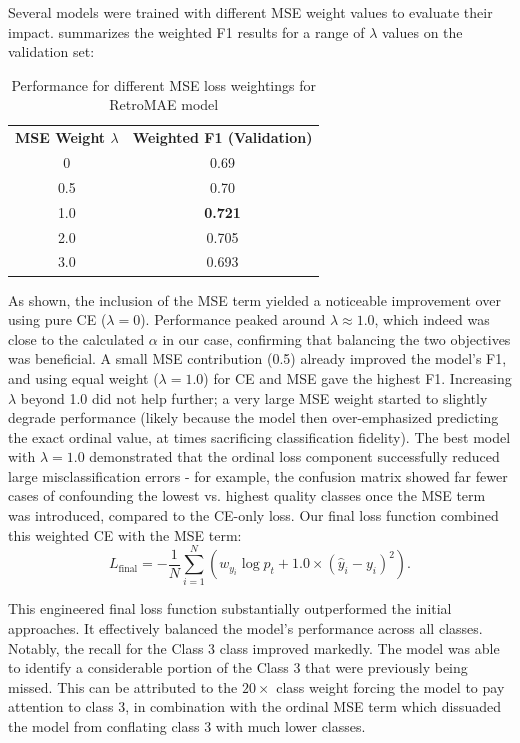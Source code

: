 Several models were trained with different \ac{MSE} weight values to evaluate their impact.  summarizes the weighted F1 results for a range of $\lambda$ values on the validation set:

\begin{table}[H]
\centering
\begin{tabular}{cc}
\textbf{MSE Weight $\lambda$} & \textbf{Weighted F1 (Validation)} \\
0 & 0.69 \\
0.5 & 0.70 \\
1.0 & \textbf{0.721} \\
2.0 & 0.705 \\
3.0 & 0.693 \\
\end{tabular}
\caption{Performance for different \ac{MSE} loss weightings for \ac{RetroMAE} model}
\label{tab:mse_weight_results}
\end{table}
As shown, the inclusion of the \ac{MSE} term yielded a noticeable improvement over using pure \ac{CE} ($\lambda=0$). Performance peaked around $\lambda \approx 1.0$, which indeed was close to the calculated $\alpha$ in our case, confirming that balancing the two objectives was beneficial. A small \ac{MSE} contribution (0.5) already improved the model's F1, and using equal weight ($\lambda=1.0$) for \ac{CE} and \ac{MSE} gave the highest F1. Increasing $\lambda$ beyond 1.0 did not help further; a very large \ac{MSE} weight started to slightly degrade performance (likely because the model then over-emphasized predicting the exact ordinal value, at times sacrificing classification fidelity). The best model with $\lambda=1.0$ demonstrated that the ordinal loss component successfully reduced large misclassification errors - for example, the confusion matrix showed far fewer cases of confounding the lowest vs. highest quality classes once the \ac{MSE} term was introduced, compared to the \ac{CE}-only loss.
Our final loss function combined this weighted \ac{CE} with the \ac{MSE} term:
\begin{equation}
  L_{\text{final}} = - \frac{1}{N} \sum_{i=1}^{N}( w_{y_i}\log p_t + 1.0 \times (\hat{y}_i - y_i)^2).
  \label{eq:final_loss}
\end{equation}

This engineered final loss function substantially outperformed the initial approaches. It effectively balanced the model's performance across all classes. Notably, the recall for the \ac{Class 3} class improved markedly. The model was able to identify a considerable portion of the \ac{Class 3} that were previously being missed. This can be attributed to the $20\times$ class weight forcing the model to pay attention to class 3, in combination with the ordinal \ac{MSE} term which dissuaded the model from conflating class 3 with much lower classes.

